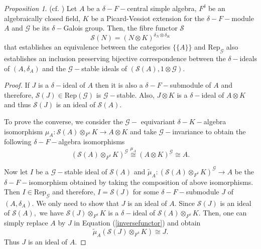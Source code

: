 \documentclass[preprint, 11pt]{amsart}
\theoremstyle{corollary}
\theoremstyle{remark}
\theoremstyle{proposition}
\newtheorem{proposition}[theorem]{Proposition}
\numberwithin{equation}{subsection}
\begin{document}
\begin{proposition} ($\mathrm{cf.}$ \cite[Corollary 2.35]{MvdP03}) \label{bijectivecorrespondence-ideals} Let $A$ be a $\delta-F-$central simple algebra, $F^{\delta}$ be an algebraically closed field, $K$ be a Picard-Vessiot extension for the $\delta-F-$module $A$ and $\mathscr G$ be its $\delta-$Galois group.  Then, the fibre functor $\mathscr S$ 
	$$\mathscr S(N)=(N\otimes K)^{\delta_N\otimes \delta_K}$$
	that establishes an equivalence between the categories $\{\{A\}\}$ and $\mathrm{Rep}_\mathscr G$ also establishes an inclusion preserving bijective correspondence between the $\delta-$ideals of $(A, \delta_A)$ and the $\mathscr G-$stable ideals of $(\mathscr S(A), 1\otimes\mathscr G).$   \end{proposition}
\begin{proof} 
	If $J$ is a $\delta-$ideal of $A$ then it is also a $\delta-F-$submodule of $A$ and therefore, $\mathscr S (J)\in \mathrm{Rep}(\mathscr G)$ is $\mathscr{G}-$stable. Also, $J\otimes K$ is a  $\delta-$ideal of $A\otimes K$ and thus $\mathscr S(J)$ is an ideal of $\mathscr S(A).$
	
	To prove the converse, we consider the $\mathscr G-$ equivariant $\delta-K-$algebra isomorphism $\mu_A:\mathscr S (A)\otimes_{F^{\delta}} K\to A\otimes K$ and  take $\mathscr{G}-$invariance to obtain  the following $\delta-F-$algebra isomorphisms \begin{equation}\label{inversefunctor}(\mathscr S (A)\otimes_{F^{\delta}} K)^\mathscr G\overset{\mu_A}{\cong}(A\otimes K)^\mathscr G \cong A.\end{equation}
	
	Now let $I$ be a $\mathscr G-$stable ideal of $\mathscr S(A)$ and $\tilde{\mu}_A:(\mathscr S (A)\otimes_{F^{\delta}} K)^\mathscr G\to A$ be the $\delta-F-$isomorphism obtained by taking the  composition of above isomorphisms. Then $I\in \mathrm{Rep}_\mathscr G$ and therefore, $I=\mathscr S(J)$ for some $\delta-F-$submodule $J$ of $(A, \delta_A).$ We only need to show that $J$ is an ideal of $A.$  Since $\mathscr S(J)$ is an ideal of $\mathscr S(A),$ we have $\mathscr S(J)\otimes_{F^{\delta}} K$ is a $\delta-$ideal of $\mathscr S (A)\otimes_{F^{\delta}} K.$ Then, one can simply replace $A$ by $J$ in Equation (\ref{inversefunctor}) and obtain $$\tilde{\mu}_A\left(\mathscr S(J)\otimes_{F^{\delta}} K\right)\cong J.$$ Thus $J$ is an ideal of $A.$ \end{proof}
\end{document}

